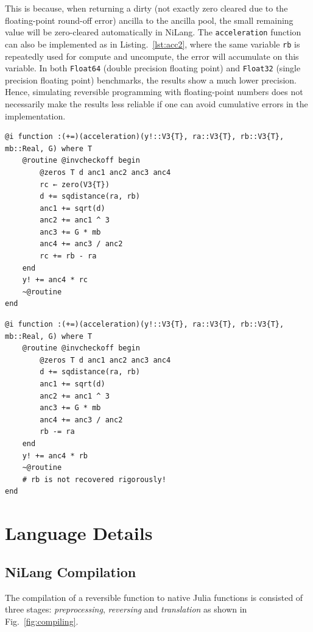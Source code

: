\documentclass{article}
\newcommand{\<}{\langle}
\renewcommand{\>}{\rangle}
\newcommand{\Fig}[1]{Fig.~\ref{#1}}
\newcommand{\Lst}[1]{Listing.~\ref{#1}}
\theoremstyle{definition}\newtheorem{definition}{\textit{Definition}}
\begin{document}
This is because, when returning a dirty (not exactly zero cleared due to the floating-point round-off error) ancilla to the ancilla pool, the small remaining value will be zero-cleared automatically in NiLang.
The \texttt{acceleration} function can also be implemented as in \Lst{lst:acc2}, where the same variable \texttt{rb} is repeatedly used for compute and uncompute, the error will accumulate on this variable.
In both \texttt{Float64} (double precision floating point) and \texttt{Float32} (single precision floating point) benchmarks, the results show a much lower precision.
Hence, simulating reversible programming with floating-point numbers does not necessarily make the results less reliable if one can avoid cumulative errors in the implementation.

\begin{minipage}{.45\textwidth}
    \begin{lstlisting}[mathescape=true,caption={Compute the acceleration. Compute and uncompute on ancilla \texttt{rc}},label={lst:acc1}, frame=tlrb]
@i function :(+=)(acceleration)(y!::V3{T}, ra::V3{T}, rb::V3{T}, mb::Real, G) where T
    @routine @invcheckoff begin
        @zeros T d anc1 anc2 anc3 anc4
        rc ← zero(V3{T})
        d += sqdistance(ra, rb)
        anc1 += sqrt(d)
        anc2 += anc1 ^ 3
        anc3 += G * mb
        anc4 += anc3 / anc2
        rc += rb - ra
    end
    y! += anc4 * rc
    ~@routine
end
\end{lstlisting}
\end{minipage}
\hfill
\begin{minipage}{.45\textwidth}
    \begin{lstlisting}[mathescape=true,caption={Compute the acceleration. Compute and uncompute on the input variable \texttt{rb}.},label={lst:acc2}, frame=tlrb]
@i function :(+=)(acceleration)(y!::V3{T}, ra::V3{T}, rb::V3{T}, mb::Real, G) where T
    @routine @invcheckoff begin
        @zeros T d anc1 anc2 anc3 anc4
        d += sqdistance(ra, rb)
        anc1 += sqrt(d)
        anc2 += anc1 ^ 3
        anc3 += G * mb
        anc4 += anc3 / anc2
        rb -= ra
    end
    y! += anc4 * rb
    ~@routine
    # rb is not recovered rigorously!
end
\end{lstlisting}
\end{minipage}

\section{Language Details}\label{app:lang}
\subsection{NiLang Compilation}\label{app:compile}
The compilation of a reversible function to native Julia functions is consisted of three stages: \textit{preprocessing}, \textit{reversing} and \textit{translation} as shown in \Fig{fig:compiling}.
\end{document}
